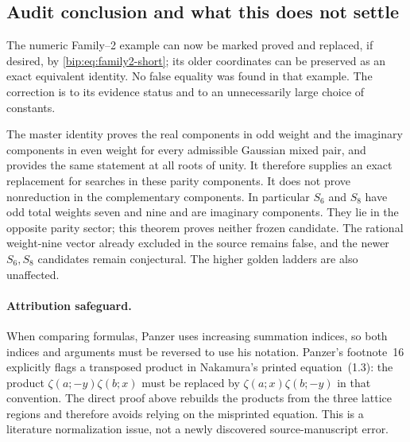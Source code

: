 \documentclass[11pt,a4paper]{article}
\numberwithin{equation}{section}
\theoremstyle{definition}
\theoremstyle{remark}
\begin{document}
\subsection{Audit conclusion and what this does not settle}
The numeric Family--2 example can now be marked proved and replaced,
if desired, by \eqref{bip:eq:family2-short}; its older coordinates can
be preserved as an exact equivalent identity. No false equality was
found in that example. The correction is to its evidence status and
to an unnecessarily large choice of constants.

The master identity proves the real components in odd weight and the
imaginary components in even weight for every admissible Gaussian
mixed pair, and provides the same statement at all roots of unity.
It therefore supplies an exact replacement for searches in these
parity components. It does not prove nonreduction in the complementary
components.
In particular $S_6$ and $S_8$ have odd total weights seven and nine
and are imaginary components. They lie in the opposite parity sector;
this theorem proves neither frozen candidate. The rational
weight-nine vector already excluded in the source remains false, and
the newer $S_6,S_8$ candidates remain conjectural. The higher golden
ladders are also unaffected.

\paragraph{Attribution safeguard.}
When comparing formulas, Panzer uses increasing summation indices,
so both indices and arguments must be reversed to use his notation.
Panzer's footnote~16 explicitly flags a transposed product in
Nakamura's printed equation~(1.3): the product
$\zeta(a;-y)\zeta(b;x)$ must be replaced by
$\zeta(a;x)\zeta(b;-y)$ in that convention. The direct proof above
rebuilds the products from the three lattice regions and therefore
avoids relying on the misprinted equation. This is a literature
normalization issue, not a newly discovered source-manuscript error.

\end{document}
